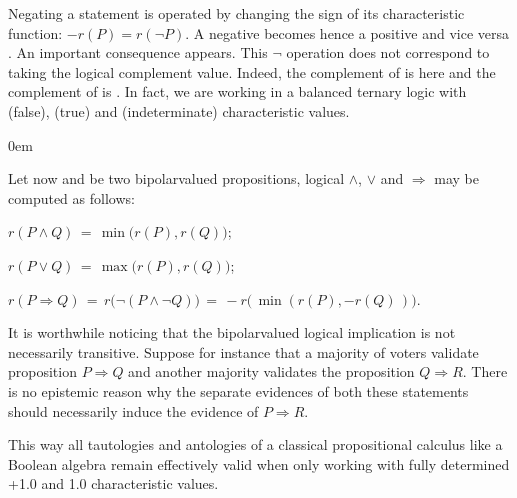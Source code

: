 \documentclass[a4paper,12pt,english]{sphinxhowto}
\begin{document}
\sphinxAtStartPar
Negating a statement is operated by changing the sign of its characteristic function: \(-r(P) = r(\neg P)\). A negative  becomes hence a positive  and vice versa . An important consequence appears. This  \(\neg\) operation does not correspond to taking the logical complement value. Indeed, the complement of  is here  and the complement of  is . In fact, we are working in a balanced ternary logic with  (false),  (true) and  (indeterminate) characteristic values.

\begin{DUlineblock}{0em}
\item[] Let now  and  be two  bipolar\sphinxhyphen{}valued propositions, logical  \(\land\),  \(\lor\) and  \(\Rightarrow\) may be computed as follows:
\item[]
\begin{DUlineblock}{\DUlineblockindent}
\item[] \(r(P \land Q) \,=\, \min\big(r(P),r(Q)\big)\);
\item[] \(r(P \lor Q) \,=\, \max\big(r(P),r(Q)\big)\);
\item[] \(r(P \Rightarrow Q)  \,=\, r\big(\neg(P \land \neg Q)\big) \,=\, -r \big(\,\min(r(P),-r(Q)\,)\big)\).
\end{DUlineblock}
\end{DUlineblock}

\sphinxAtStartPar
It is worthwhile noticing that the bipolar\sphinxhyphen{}valued logical implication is not necessarily transitive. Suppose for instance that a majority of voters validate proposition \(P \Rightarrow Q\) and another majority validates the proposition \(Q \Rightarrow R\). There is no epistemic reason why the separate evidences of both these statements should necessarily induce the evidence of \(P \Rightarrow R\).

\sphinxAtStartPar
This way all tautologies and antologies of a classical propositional calculus like a Boolean algebra remain effectively valid when only working with fully determined +1.0 and \sphinxhyphen{}1.0 characteristic values.
\end{document}
